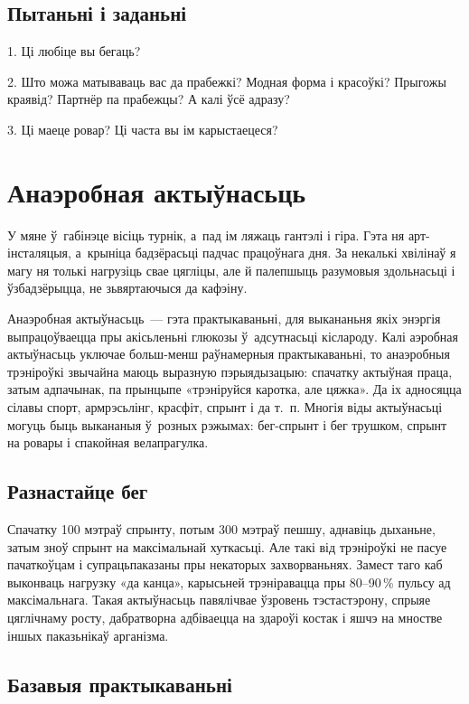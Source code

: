\subsection*{Пытаньні і заданьні}

1. Ці любіце вы бегаць?

2. Што можа матываваць вас да прабежкі? Модная форма і красоўкі? Прыгожы краявід? Партнёр па прабежцы? А калі ўсё адразу?

3. Ці маеце ровар? Ці часта вы ім карыстаецеся?


\section{Анаэробная актыўнасьць}

У мяне ў~габінэце вісіць турнік, а~пад ім ляжаць гантэлі і гіра. Гэта ня арт-інсталяцыя, а~крыніца бадзёрасьці падчас працоўнага дня. За некалькі хвілінаў я магу ня толькі нагрузіць свае цягліцы, але й палепшыць разумовыя здольнасьці і ўзбадзёрыцца, не зьвяртаючыся да кафэіну.

Анаэробная актыўнасьць~--- гэта практыкаваньні, для выкананьня якіх энэргія выпрацоўваецца пры акісьленьні глюкозы ў~адсутнасьці кіслароду. Калі аэробная актыўнасьць уключае больш-менш раўнамерныя практыкаваньні, то анаэробныя трэніроўкі звычайна маюць выразную пэрыядызацыю: спачатку актыўная праца, затым адпачынак, па прынцыпе «трэніруйся каротка, але цяжка». Да іх адносяцца сілавы спорт, армрэсьлінг, красфіт, спрынт і да т.~п. Многія віды актыўнасьці могуць быць выкананыя ў~розных рэжымах: бег-спрынт і бег трушком, спрынт на ровары і спакойная велапрагулка.

\subsection*{Разнастайце бег}

Спачатку 100 мэтраў спрынту, потым 300 мэтраў пешшу, аднавіць дыханьне, затым зноў спрынт на максімальнай хуткасьці. Але такі від трэніроўкі не пасуе пачаткоўцам і супрацьпаказаны пры некаторых захворваньнях. Замест таго каб выконваць нагрузку «да канца», карысьней трэніравацца пры 80--90\,\% пульсу ад максімальнага. Такая актыўнасьць павялічвае ўзровень тэстастэрону, спрыяе цяглічнаму росту, дабратворна адбіваецца на здароўі костак і яшчэ на мностве іншых паказьнікаў арганізма.

\subsection*{Базавыя практыкаваньні}

